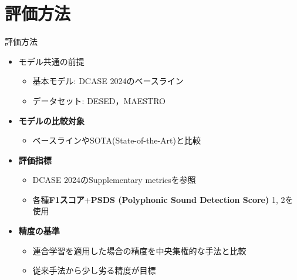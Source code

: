 \documentclass[unicode,12pt,aspectratio=169,dvipdfmx]{beamer}
\begin{document}
\section{評価方法}
\begin{frame}{評価方法}
    \begin{itemize}
        \item モデル共通の前提
        \begin{itemize}
            \item 基本モデル: DCASE 2024のベースライン
            \item データセット: DESED，MAESTRO
        \end{itemize}

        \item \textbf{モデルの比較対象}
        \begin{itemize}
            \item ベースラインやSOTA(State-of-the-Art)と比較
        \end{itemize}
        \item \textbf{評価指標}
        \begin{itemize}
            \item DCASE 2024のSupplementary metricsを参照
            \item 各種\textbf{F1スコア}+\textbf{PSDS (Polyphonic Sound Detection Score)} 1, 2を使用
        \end{itemize}
        \item \textbf{精度の基準}
        \begin{itemize}
            \item 連合学習を適用した場合の精度を中央集権的な手法と比較
            \item 従来手法から少し劣る精度が目標
        \end{itemize}
    \end{itemize}
\end{frame}
\end{document}
